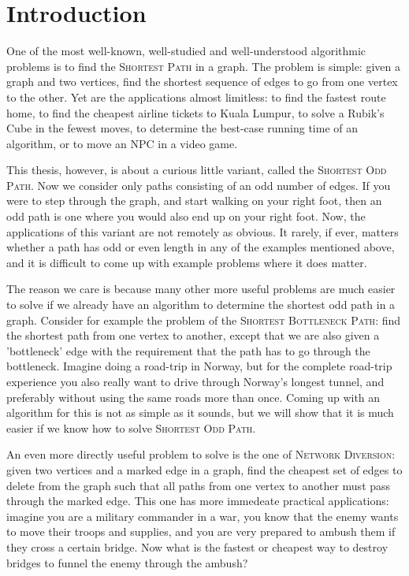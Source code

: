 \chapter{Introduction}

One of the most well-known, well-studied and well-understood algorithmic problems is to find the \textsc{Shortest Path} in a graph. The problem is simple: given a graph and two vertices, find the shortest sequence of edges to go from one vertex to the other. Yet are the applications almost limitless: to find the fastest route home, to find the cheapest airline tickets to Kuala Lumpur, to solve a Rubik's Cube in the fewest moves, to determine the best-case running time of an algorithm, or to move an NPC in a video game.

This thesis, however, is about a curious little variant, called the \textsc{Shortest Odd Path}. Now we consider only paths consisting of an odd number of edges. If you were to step through the graph, and start walking on your right foot, then an odd path is one where you would also end up on your right foot. Now, the applications of this variant are not remotely as obvious. It rarely, if ever, matters whether a path has odd or even length in any of the examples mentioned above, and it is difficult to come up with example problems where it does matter.

The reason we care is because many other more useful problems are much easier to solve if we already have an algorithm to determine the shortest odd path in a graph. Consider for example the problem of the \textsc{Shortest Bottleneck Path}: find the shortest path from one vertex to another, except that we are also given a 'bottleneck' edge with the requirement that the path has to go through the bottleneck. Imagine doing a road-trip in Norway, but for the complete road-trip experience you also really want to drive through Norway's longest tunnel, and preferably without using the same roads more than once. Coming up with an algorithm for this is not as simple as it sounds, but we will show that it is much easier if we know how to solve \textsc{Shortest Odd Path}.

An even more directly useful problem to solve is the one of \textsc{Network Diversion}: given two vertices and a marked edge in a graph, find the cheapest set of edges to delete from the graph such that all paths from one vertex to another must pass through the marked edge. This one has more immedeate practical applications: imagine you are a military commander in a war, you know that the enemy wants to move their troops and supplies, and you are very prepared to ambush them if they cross a certain bridge. Now what is the fastest or cheapest way to destroy bridges to funnel the enemy through the ambush?

